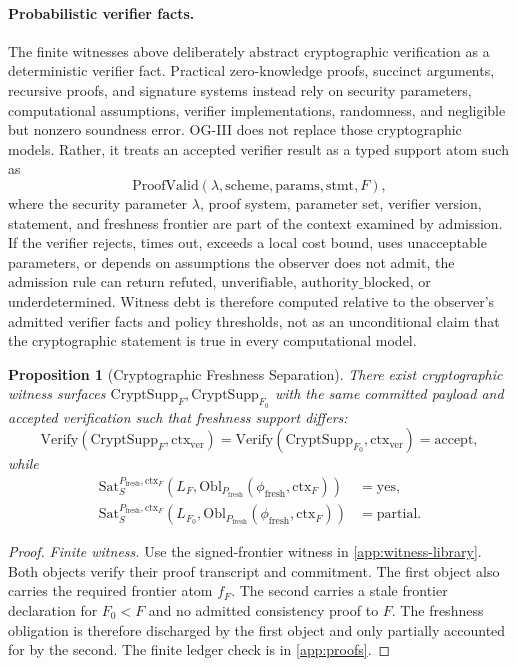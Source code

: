 \documentclass[11pt,twoside]{article}
\newtheorem{proposition}[theorem]{Proposition}
\theoremstyle{definition}
\newcommand{\Obl}{\mathrm{Obl}}
\newcommand{\CryptSupp}{\mathrm{CryptSupp}}
\newcommand{\Sat}{\mathrm{Sat}}
\newcommand{\Verify}{\mathrm{Verify}}
\newcommand{\ctx}{\mathrm{ctx}}
\newcommand{\fresh}{\mathrm{fresh}}
\newcommand{\refuted}{\mathrm{refuted}}
\newcommand{\underdetermined}{\mathrm{underdetermined}}
\newcommand{\authorityblocked}{\mathrm{authority\_blocked}}
\newcommand{\unverifiable}{\mathrm{unverifiable}}
\begin{document}
\paragraph{Probabilistic verifier facts.}
The finite witnesses above deliberately abstract cryptographic verification as
a deterministic verifier fact. Practical zero-knowledge proofs, succinct
arguments, recursive proofs, and signature systems instead rely on security
parameters, computational assumptions, verifier implementations, randomness,
and negligible but nonzero soundness error. OG-III does not replace those
cryptographic models. Rather, it treats an accepted verifier result as a typed
support atom such as
\[
  \mathrm{ProofValid}(\lambda,\mathrm{scheme},\mathrm{params},
  \mathrm{stmt},F),
\]
where the security parameter $\lambda$, proof system, parameter set, verifier
version, statement, and freshness frontier are part of the context examined by
admission. If the verifier rejects, times out, exceeds a local cost bound, uses
unacceptable parameters, or depends on assumptions the observer does not admit,
the admission rule can return $\refuted$, $\unverifiable$,
$\authorityblocked$, or $\underdetermined$. Witness debt is therefore computed
relative to the observer's admitted verifier facts and policy thresholds, not
as an unconditional claim that the cryptographic statement is true in every
computational model.

\begin{proposition}[Cryptographic Freshness Separation]
\label{prop:cryptographic-freshness-separation}
There exist cryptographic witness surfaces
$\CryptSupp_F,\CryptSupp_{F_0}$ with the same committed payload and accepted
verification such that freshness support differs:
\[
  \Verify(\CryptSupp_F,\ctx_{\mathrm{ver}})=
  \Verify(\CryptSupp_{F_0},\ctx_{\mathrm{ver}})=\mathrm{accept},
\]
while
\[
  \begin{aligned}
  \Sat_S^{P_{\fresh},\ctx_F}
    (L_F,\Obl_{P_{\fresh}}(\phi_{\fresh},\ctx_F))
    &=\mathrm{yes},\\
  \Sat_S^{P_{\fresh},\ctx_F}
    (L_{F_0},\Obl_{P_{\fresh}}(\phi_{\fresh},\ctx_F))
    &=\mathrm{partial}.
  \end{aligned}
\]
\end{proposition}

\begin{proof}
\textit{Finite witness.}
Use the signed-frontier witness in \cref{app:witness-library}. Both objects
verify their proof transcript and commitment. The first object also carries the
required frontier atom $f_F$. The second carries a stale frontier declaration
for $F_0<F$ and no admitted consistency proof to $F$. The freshness obligation is
therefore discharged by the first object and only partially accounted for by the
second. The finite ledger check is in \cref{app:proofs}.
\end{proof}
\end{document}

